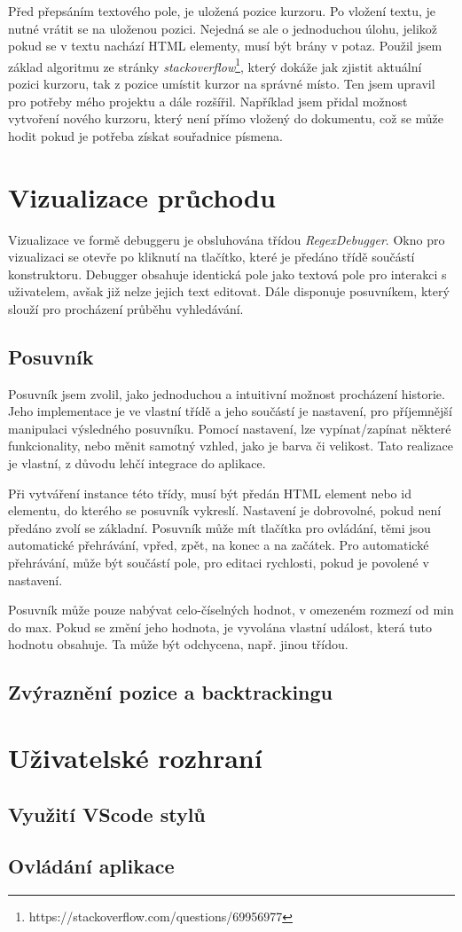 Před přepsáním textového pole, je uložená pozice kurzoru.
Po vložení textu, je nutné vrátit se na uloženou pozici. 
Nejedná se ale o jednoduchou úlohu, jelikož pokud se v textu nachází HTML elementy, musí být brány v potaz.
Použil jsem základ algoritmu ze stránky \textit{stackoverflow}\footnote{https://stackoverflow.com/questions/69956977}, který dokáže jak zjistit aktuální pozici kurzoru, tak z pozice umístit kurzor na správné místo.
Ten jsem upravil pro potřeby mého projektu a dále rozšířil.
Například jsem přidal možnost vytvoření nového kurzoru, který není přímo vložený do dokumentu, což se může hodit pokud je potřeba získat souřadnice písmena.

\section{Vizualizace průchodu}

Vizualizace ve formě debuggeru je obsluhována třídou \textit{RegexDebugger}.
Okno pro vizualizaci se otevře po kliknutí na tlačítko, které je předáno třídě součástí konstruktoru.
Debugger obsahuje identická pole jako textová pole pro interakci s uživatelem, avšak již nelze jejich text editovat.
Dále disponuje posuvníkem, který slouží pro procházení průběhu vyhledávání. 

\subsection*{Posuvník}

Posuvník jsem zvolil, jako jednoduchou a intuitivní možnost procházení historie.
Jeho implementace je ve vlastní třídě a jeho součástí je nastavení, pro příjemnější manipulaci výsledného posuvníku.
Pomocí nastavení, lze vypínat/zapínat některé funkcionality, nebo měnit samotný vzhled, jako je barva či velikost.
Tato realizace je vlastní, z důvodu lehčí integrace do aplikace.

Při vytváření instance této třídy, musí být předán HTML element nebo id elementu, do kterého se posuvník vykreslí.
Nastavení je dobrovolné, pokud není předáno zvolí se základní.
Posuvník může mít tlačítka pro ovládání, těmi jsou automatické přehrávání, vpřed, zpět, na konec a na začátek.
Pro automatické přehrávání, může být součástí pole, pro editaci rychlosti, pokud je povolené v nastavení.

Posuvník může pouze nabývat celo-číselných hodnot, v omezeném rozmezí od min do max.
Pokud se změní jeho hodnota, je vyvolána vlastní událost, která tuto hodnotu obsahuje.
Ta může být odchycena, např. jinou třídou.

\subsection*{Zvýraznění pozice a backtrackingu}

\section{Uživatelské rozhraní}

\subsection*{Využití VScode stylů}

\subsection*{Ovládání aplikace}

\endinput